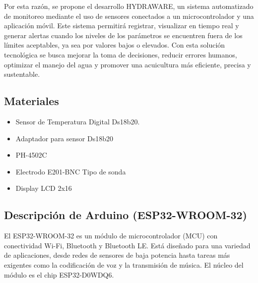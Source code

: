 \documentclass[a4paper,12pt]{article}
\begin{document}
	Por esta razón, se propone el desarrollo HYDRAWARE, un sistema automatizado de monitoreo mediante el uso de sensores conectados a un microcontrolador y una aplicación móvil. Este sistema permitirá registrar, visualizar en tiempo real y generar alertas cuando los niveles de los parámetros se encuentren fuera de los límites aceptables, ya sea por valores bajos o elevados. Con esta solución tecnológica se busca mejorar la toma de decisiones, reducir errores humanos, optimizar el manejo del agua y promover una acuicultura más eficiente, precisa y sustentable.
	
	\subsection{Materiales}
	\begin{itemize}
		\item Sensor de Temperatura Digital Ds18b20.
		\item Adaptador para sensor Ds18b20
		\item PH-4502C
		\item Electrodo E201-BNC Tipo de sonda
		\item Display LCD 2x16
	\end{itemize}
	
	\subsection{Descripción de Arduino (ESP32-WROOM-32)}
	El ESP32-WROOM-32 es un módulo de microcontrolador (MCU) con conectividad Wi-Fi, Bluetooth y Bluetooth LE. Está diseñado para una variedad de aplicaciones, desde redes de sensores de baja potencia hasta tareas más exigentes como la codificación de voz y la transmisión de música. El núcleo del módulo es el chip ESP32-D0WDQ6.
	
\end{document}
